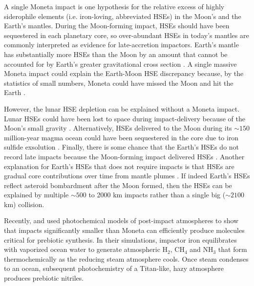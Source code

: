 \documentclass{Liebert_Author}
\begin{document}
A single Moneta impact is one hypothesis for the relative excess of highly siderophile elements (i.e. iron-loving, abbreviated HSEs) in the Moon's and the Earth's mantles. During the Moon-forming impact, HSEs should have been sequestered in each planetary core, so over-abundant HSEs in today's mantles are commonly interpreted as evidence for late-accretion impactors. Earth's mantle has substantially more HSEs than the Moon by an amount that cannot be accounted for by Earth's greater gravitational cross section \citep{Day_2015}. A single massive Moneta impact could explain the Earth-Moon HSE discrepancy because, by the statistics of small numbers, Moneta could have missed the Moon and hit the Earth \citep{Sleep_1989,Bottke_2010}.

However, the lunar HSE depletion can be explained without a Moneta impact. Lunar HSEs could have been lost to space during impact-delivery because of the Moon's small gravity \citep{Kraus_2015}. Alternatively, HSEs delivered to the Moon during its $\sim 150$ million-year magma ocean could have been sequestered in the core due to iron sulfide exsolution \citep{Morbidelli_2018,Rubie_2016}. Finally, there is some chance that the Earth's HSEs do not record late impacts because the Moon-forming impact delivered HSEs \citep{Sleep_2016}. Another explanation for Earth's HSEs that does not require impacts is that HSEs are gradual core contributions over time from mantle plumes \citep{Halliday_2023,Mundl_2020}. If indeed Earth's HSEs reflect asteroid bombardment after the Moon formed, then the HSEs can be explained by multiple $\sim 500$ to 2000 km impacts rather than a single big ($\sim 2100$ km) collision.

Recently, \citet{Wogan_2023} and \citet{Zahnle_2020} used photochemical models of post-impact atmospheres to show that impacts significantly smaller than Moneta can efficiently produce molecules critical for prebiotic synthesis. In their simulations, impactor iron equilibrates with vaporized ocean water to generate atmospheric H$_2$, CH$_4$ and NH$_3$ that form thermochemically as the reducing steam atmosphere cools. Once steam condenses to an ocean, subsequent photochemistry of a Titan-like, hazy atmosphere produces prebiotic nitriles. 
\end{document}
